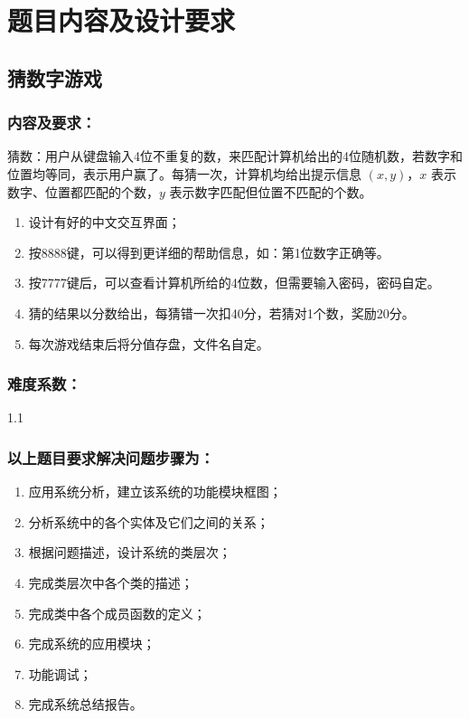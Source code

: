 \section{题目内容及设计要求}

\subsection*{猜数字游戏}

\subsubsection*{内容及要求：}

猜数：用户从键盘输入4位不重复的数，来匹配计算机给出的4位随机数，若数字和位置均等同，表示用户赢了。每猜一次，计算机均给出提示信息 $(x, y)$，$x$ 表示数字、位置都匹配的个数，$y$ 表示数字匹配但位置不匹配的个数。

\begin{enumerate}[label={（\arabic*）}]
\item 设计有好的中文交互界面；
\item 按8888键，可以得到更详细的帮助信息，如：第1位数字正确等。
\item 按7777键后，可以查看计算机所给的4位数，但需要输入密码，密码自定。
\item 猜的结果以分数给出，每猜错一次扣40分，若猜对1个数，奖励20分。
\item 每次游戏结束后将分值存盘，文件名自定。
\end{enumerate}

\subsubsection*{难度系数：}

1.1

\subsubsection*{以上题目要求解决问题步骤为：}

\begin{enumerate}[label={（\arabic*）}]
\item 应用系统分析，建立该系统的功能模块框图；
\item 分析系统中的各个实体及它们之间的关系；
\item 根据问题描述，设计系统的类层次；
\item 完成类层次中各个类的描述；
\item 完成类中各个成员函数的定义；
\item 完成系统的应用模块；
\item 功能调试；
\item 完成系统总结报告。
\end{enumerate}
